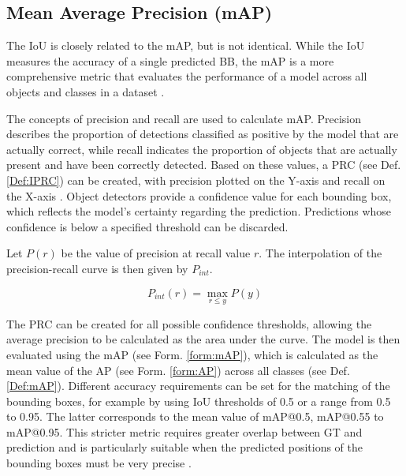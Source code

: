 \subsection{Mean Average Precision (mAP)}

The \acrlong{IoU} is closely related to the \acrfull{mAP}, but is not identical. While the \acrshort{IoU} measures the accuracy of a single predicted \acrshort{BB}, the \acrshort{mAP} is a more comprehensive metric that evaluates the performance of a model across all objects and classes in a dataset \cite {ultralyics_iou}.

The concepts of precision and recall are used to calculate \acrshort{mAP}. Precision describes the proportion of detections classified as positive by the model that are actually correct, while recall indicates the proportion of objects that are actually present and have been correctly detected. Based on these values, a \acrfull{PRC} (see Def. \ref{Def:IPRC}) can be created, with precision plotted on the Y-axis and recall on the X-axis \cite{Goodfellow-et-al-2016}. Object detectors provide a confidence value for each bounding box, which reflects the model's certainty regarding the prediction. Predictions whose confidence is below a specified threshold can be discarded.
 

\begin{definition}
\label{Def:IPRC}
Let $P(r)$ be the value of precision at recall value $r$. 
The interpolation of the precision-recall curve is then given by $P_{int}$.

\begin{equation}
P_{int}(r) = \max_{r \leq y} P(y)
\end{equation}
\end{definition}


The \acrshort{PRC} can be created for all possible confidence thresholds, allowing the average precision to be calculated as the area under the curve. The model is then evaluated using the \acrfull{mAP} (see Form. \ref{form:mAP}), which is calculated as the mean value of the \acrfull{AP} (see Form. \ref{form:AP}) across all classes (see Def. \ref{Def:mAP})\cite{Rainio2024}. Different accuracy requirements can be set for the matching of the bounding boxes, for example by using IoU thresholds of 0.5 or a range from 0.5 to 0.95. The latter corresponds to the mean value of \acrshort{mAP}@0.5, \acrshort{mAP}@0.55 to \acrshort{mAP}@0.95. This stricter metric requires greater overlap between \acrshort{GT} and prediction and is particularly suitable when the predicted positions of the bounding boxes must be very precise \cite{Rainio2024}.


